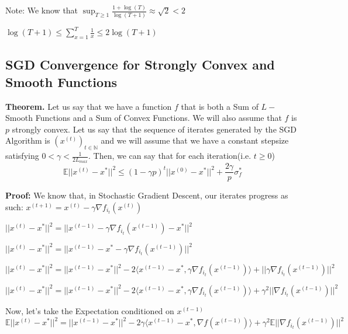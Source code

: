 Note: We know that $\sup_{T \geq 1} \frac{1 + \log(T)}{\log(T + 1)} \approx \sqrt{2} < 2$ \newline

$\log(T + 1) \leq \sum_{x=1}^{T} \frac{1}{x} \leq 2 \log(T + 1)$ \newline 



\subsection{SGD Convergence for Strongly Convex and Smooth Functions}
\noindent \textbf{Theorem.} Let us say that we have a function $f$ that is both a Sum of $L-$Smooth Functions and a Sum of Convex Functions. We will also assume that $f$ is $p$ strongly convex. Let us say that the sequence of iterates generated by the SGD Algorithm is $(x^{(t)})_{t \in \mathbb{N}}$ and we will assume that we have a constant stepsize satisfying $0 < \gamma < \frac{1}{2L_{max}}$. Then, we can say that for each iteration(i.e. $t \geq 0$) 
\begin{equation}
    \mathbb{E}||x^{(t)} - x^*||^2 \leq (1 - \gamma p)^t ||x^{(0)} - x^*||^2 + \frac{2 \gamma}{p} \sigma_f^*
\end{equation}

\noindent \textbf{Proof:} \newline 
We know that, in Stochastic Gradient Descent, our iterates progress as such: $x^{(t + 1)}  = x^{(t)} - \gamma \nabla f_{i_t}(x^{(t)})$ \newline 

$||x^{(t)} - x^*||^2 = ||x^{(t - 1)} - \gamma \nabla f_{i_t}(x^{(t - 1)}) - x^*||^2$ \newline 

$||x^{(t)} - x^*||^2 = ||x^{(t - 1)} - x^* - \gamma \nabla f_{i_t}(x^{(t - 1)})||^2$ \newline 


$||x^{(t)} - x^*||^2 = ||x^{(t - 1)} - x^*||^2 - 2\langle x^{(t - 1)} - x^*,  \gamma \nabla f_{i_t}(x^{(t - 1)})\rangle + ||\gamma \nabla f_{i_t}(x^{(t - 1)})||^2$

$||x^{(t)} - x^*||^2 = ||x^{(t - 1)} - x^*||^2 - 2\langle x^{(t - 1)} - x^*,  \gamma \nabla f_{i_t}(x^{(t - 1)})\rangle + \gamma^2 ||\nabla f_{i_t}(x^{(t - 1)})||^2$

Now, let's take the Expectation conditioned on $x^{(t - 1)}$ \newline 
$\mathbb{E}||x^{(t)} - x^*||^2 = ||x^{(t - 1)} - x^*||^2 - 2\gamma \langle x^{(t - 1)} - x^*,  \nabla f(x^{(t - 1)})\rangle + \gamma^2 \mathbb{E} ||\nabla f_{i_t}(x^{(t - 1)})||^2$ \newline 


